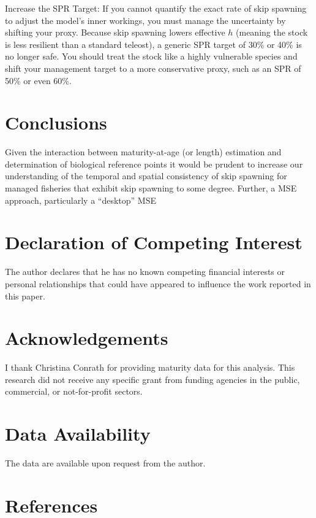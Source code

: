 \documentclass[
  authoryear,
  preprint,
  3p]{elsarticle}
\begin{document}
Increase the SPR Target: If you cannot quantify the exact rate of skip
spawning to adjust the model's inner workings, you must manage the
uncertainty by shifting your proxy. Because skip spawning lowers
effective \(h\) (meaning the stock is less resilient than a standard
teleost), a generic SPR target of 30\% or 40\% is no longer safe. You
should treat the stock like a highly vulnerable species and shift your
management target to a more conservative proxy, such as an SPR of 50\%
or even 60\%.

\section{Conclusions}\label{conclusions}

Given the interaction between maturity-at-age (or length) estimation and
determination of biological reference points it would be prudent to
increase our understanding of the temporal and spatial consistency of
skip spawning for managed fisheries that exhibit skip spawning to some
degree. Further, a MSE approach, particularly a ``desktop'' MSE
\citep{Walter2023}

\section{Declaration of Competing
Interest}\label{declaration-of-competing-interest}

The author declares that he has no known competing financial interests
or personal relationships that could have appeared to influence the work
reported in this paper.

\section{Acknowledgements}\label{acknowledgements}

I thank Christina Conrath for providing maturity data for this analysis.
This research did not receive any specific grant from funding agencies
in the public, commercial, or not-for-profit sectors.

\section{Data Availability}\label{data-availability}

The data are available upon request from the author.

\section{References}\label{references}
\end{document}
